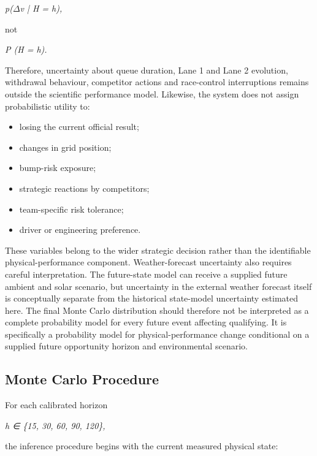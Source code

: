 \begin{center}\textit{p(\ensuremath{\Delta}v | H = h),}\end{center}

not

\begin{center}\textit{P (H = h).}\end{center}

Therefore, uncertainty about queue duration, Lane 1 and Lane 2 evolution, withdrawal behaviour, competitor actions and race-control interruptions remains outside the scientific performance model. Likewise, the system does not assign probabilistic utility to:

\begin{itemize}
\item losing the current official result;
\item changes in grid position;
\item bump-risk exposure;
\item strategic reactions by competitors;
\item team-specific risk tolerance;
\item driver or engineering preference.
\end{itemize}

These variables belong to the wider strategic decision rather than the identifiable physical-performance component. Weather-forecast uncertainty also requires careful interpretation. The future-state model can receive a supplied future ambient and solar scenario, but uncertainty in the external weather forecast itself is conceptually separate from the historical state-model uncertainty estimated here. The final Monte Carlo distribution should therefore not be interpreted as a complete probability model for every future event affecting qualifying. It is specifically a probability model for physical-performance change conditional on a supplied future opportunity horizon and environmental scenario.

\subsection{Monte Carlo Procedure}
For each calibrated horizon

\begin{center}\textit{h ∈ \{15, 30, 60, 90, 120\},}\end{center}

the inference procedure begins with the current measured physical state:

